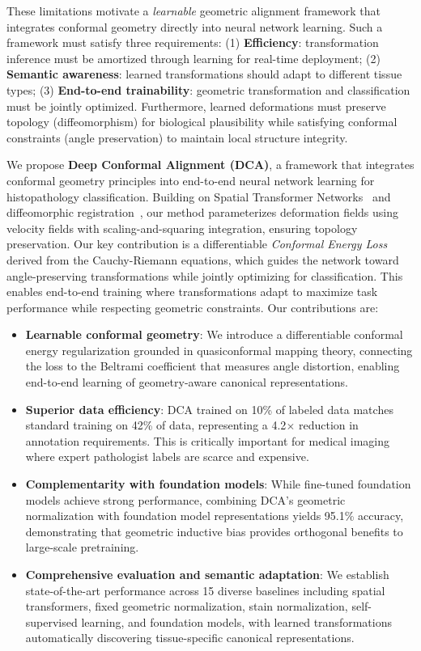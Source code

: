\documentclass[10pt,journal,compsoc]{IEEEtran}
\begin{document}
These limitations motivate a \textit{learnable} geometric alignment framework that integrates conformal geometry directly into neural network learning. Such a framework must satisfy three requirements: (1) \textbf{Efficiency}: transformation inference must be amortized through learning for real-time deployment; (2) \textbf{Semantic awareness}: learned transformations should adapt to different tissue types; (3) \textbf{End-to-end trainability}: geometric transformation and classification must be jointly optimized. Furthermore, learned deformations must preserve topology (diffeomorphism) for biological plausibility while satisfying conformal constraints (angle preservation) to maintain local structure integrity.

We propose \textbf{Deep Conformal Alignment (DCA)}, a framework that integrates conformal geometry principles into end-to-end neural network learning for histopathology classification. Building on Spatial Transformer Networks~\cite{jaderberg2015spatial} and diffeomorphic registration~\cite{balakrishnan2019voxelmorph}, our method parameterizes deformation fields using velocity fields with scaling-and-squaring integration, ensuring topology preservation. Our key contribution is a differentiable \textit{Conformal Energy Loss} derived from the Cauchy-Riemann equations, which guides the network toward angle-preserving transformations while jointly optimizing for classification. This enables end-to-end training where transformations adapt to maximize task performance while respecting geometric constraints. Our contributions are:
\begin{itemize}
    \item \textbf{Learnable conformal geometry}: We introduce a differentiable conformal energy regularization grounded in quasiconformal mapping theory, connecting the loss to the Beltrami coefficient that measures angle distortion, enabling end-to-end learning of geometry-aware canonical representations.
    \item \textbf{Superior data efficiency}: DCA trained on 10\% of labeled data matches standard training on 42\% of data, representing a 4.2$\times$ reduction in annotation requirements. This is critically important for medical imaging where expert pathologist labels are scarce and expensive.
    \item \textbf{Complementarity with foundation models}: While fine-tuned foundation models achieve strong performance, combining DCA's geometric normalization with foundation model representations yields 95.1\% accuracy, demonstrating that geometric inductive bias provides orthogonal benefits to large-scale pretraining.
    \item \textbf{Comprehensive evaluation and semantic adaptation}: We establish state-of-the-art performance across 15 diverse baselines including spatial transformers, fixed geometric normalization, stain normalization, self-supervised learning, and foundation models, with learned transformations automatically discovering tissue-specific canonical representations.
\end{itemize}
\end{document}
